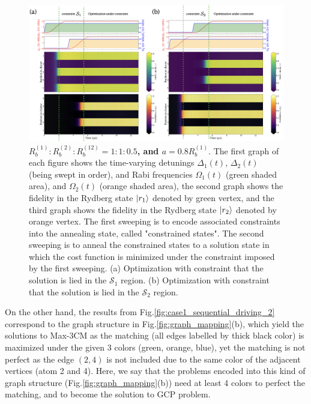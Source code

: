 \documentclass[%
 reprint,
nofootinbib,
 amsmath,amssymb,
 aps,
pra,
floatfix,
]{revtex4-2}
\begin{document}
\begin{figure}[ht!]
    \centering
    \includegraphics[width=14cm]{picture/case1_QOconstraint2.png}
    \caption{\textbf{$R^{(1)}_b:R^{(2)}_b:R^{(12)}_b=1:1:0.5$, and $a = 0.8R^{(1)}_b$}. The first graph of each figure shows the time-varying detunings $\Delta_1(t)$, $\Delta_2(t)$ (being swept in order), and Rabi frequencies $\Omega_1(t)$ (green shaded area), and $\Omega_2(t)$ (orange shaded area), the second graph shows the fidelity in the Rydberg state $\ket{r_1}$ denoted by green vertex, and the third graph shows the fidelity in the Rydberg state $\ket{r_2}$ denoted by orange vertex. The first sweeping is to encode associated constraints into the annealing state, called "constrained states". The second sweeping is to anneal the constrained states to a solution state in which the cost function is minimized under the constraint imposed by the first sweeping. (a) Optimization with constraint that the solution is lied in the $\mathcal{S}_1$ region. (b) Optimization with constraint that the solution is lied in the $\mathcal{S}_2$ region.}
    \label{fig:case1_sequential_driving_1}
\end{figure}
On the other hand, the results from Fig.\ref{fig:case1_sequential_driving_2} correspond to the graph structure in Fig.\ref{fig:graph_mapping}(b), which yield the solutions to Max-3CM as the matching (all edges labelled by thick black color) is maximized under the given 3 colors (green, orange, blue), yet the matching is not perfect as the edge $(2,4)$ is not included due to the same color of the adjacent vertices (atom 2 and 4). Here, we say that the problems encoded into this kind of graph structure (Fig.\ref{fig:graph_mapping}(b)) need at least 4 colors to perfect the matching, and to become the solution to GCP problem. 
\end{document}
